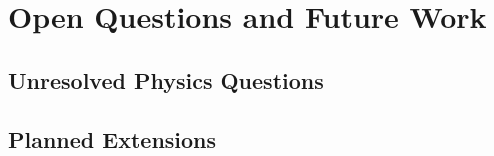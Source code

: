 \newpage
\section{Open Questions and Future Work}

\subsection{Unresolved Physics Questions}
\subsection{Planned Extensions}
